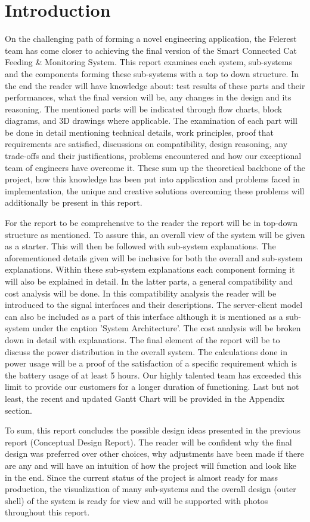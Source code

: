 \section{Introduction}
\label{sec:introduction}


On the challenging path of forming a novel engineering application, the Felerest team has come closer to achieving the final version of the Smart Connected Cat Feeding \& Monitoring System. This report examines each system, sub-systems and the components forming these sub-systems with a top to down structure. In the end the reader will have knowledge about: test results of these parts and their performances, what the final version will be, any changes in the design and its reasoning. The mentioned parts will be indicated through flow charts, block diagrams, and 3D drawings where applicable. The examination of each part will be done in detail mentioning technical details, work principles, proof that requirements are satisfied, discussions on compatibility, design reasoning, any trade-offs and their justifications, problems encountered and how our exceptional team of engineers have overcome it. These sum up the theoretical backbone of the project, how this knowledge has been put into application and problems faced in implementation, the unique and creative solutions overcoming these problems will additionally be present in this report. 

For the report to be comprehensive to the reader the report will be in top-down structure as mentioned. To assure this, an overall view of the system will be given as a starter. This will then be followed with sub-system explanations. The aforementioned details given will be inclusive for both the overall and sub-system explanations. Within these sub-system explanations each component forming it will also be explained in detail. In the latter parts, a general compatibility and cost analysis will be done. In this compatibility analysis the reader will be introduced to the signal interfaces and their descriptions. The server-client model can also be included as a part of this interface although it is mentioned as a sub-system under the caption 'System Architecture'. The cost analysis will be broken down in detail with explanations. The final element of the report will be to discuss the power distribution in the overall system. The calculations done in power usage will be a proof of the satisfaction of a specific requirement which is the battery usage of at least 5 hours. Our highly talented team has exceeded this limit to provide our customers for a longer duration of functioning. Last but not least, the recent and updated Gantt Chart will be provided in the Appendix section. 

To sum, this report concludes the possible design ideas presented in the previous report (Conceptual Design Report). The reader will be confident why the final design was preferred over other choices, why adjustments have been made if there are any and will have an intuition of how the project will function and look like in the end. Since the current status of the project is almost ready for mass production, the visualization of many sub-systems and the overall design (outer shell) of the system is ready for view and will be supported with photos throughout this report. 
